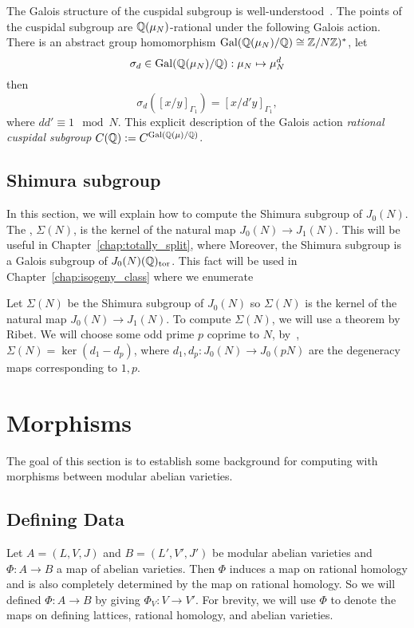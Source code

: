 The Galois structure of the cuspidal subgroup is well-understood~\cite[\S
1.3]{stevens:thesis}. The points of the cuspidal subgroup are
$\mathbb{Q}(\mu_N)$-rational under the following Galois action. There is an abstract
group homomorphism $\operatorname{Gal}(\mathbb{Q}(\mu_N)/\mathbb{Q})\cong \mathbb{Z}/N\mathbb{Z})^*$, let
\[
    \sigma_d\in \operatorname{Gal}(\mathbb{Q}(\mu_N)/\mathbb{Q}):\mu_N\mapsto \mu_N ^d
\]
then
\[
    \sigma_d([x/y]_{\Gamma_1})=[x/d'y]_{\Gamma_1},
\]
where $dd'\equiv 1 \mod{N}$. This explicit description of the Galois action
\emph{rational cuspidal subgroup} $C(\mathbb{Q}):=C^{\operatorname{Gal}(\mathbb{Q}(\mu)/\mathbb{Q})}$.

\subsection{Shimura subgroup}%
\label{sub:shimura}

In this section, we will explain how to compute the Shimura subgroup of
$J_0(N)$. The , $\Sigma(N)$, is the kernel of the
natural map $J_0(N)\to J_1(N)$. This will be useful in
Chapter~\ref{chap:totally_split}, where 
Moreover, the Shimura subgroup is a Galois subgroup of $J_0(N)(\mathbb{Q})_{\mathrm{tor}}$. This
fact will be used in Chapter~\ref{chap:isogeny_class} where we enumerate

Let $\Sigma(N)$ be the Shimura subgroup of $J_0(N)$ so $\Sigma(N)$ is the
kernel of the natural map $J_0(N)\to J_1(N)$. To compute $\Sigma(N)$, we will
use a theorem by Ribet. We will choose some odd prime $p$ coprime to $N$,
by~\cite[Prop. 1]{ribet:raising}, $\Sigma(N)=\ker(d_1-d_p)$, where
$d_1,d_p:J_0(N)\to J_0(pN)$ are the degeneracy maps corresponding to $1,p$.

\section{Morphisms}%
\label{sec:morphisms}

The goal of this section is to establish some background for computing with
morphisms between modular abelian varieties.

\subsection{Defining Data}%
\label{sub:defining_data}

Let $A=(L, V, J)$ and $B=(L', V', J')$ be modular abelian varieties and
$\Phi:A\to B$ a map of abelian varieties. Then $\Phi$ induces a map on rational
homology and is also completely determined by the map on rational homology. So
we will defined $\Phi:A\to B$ by giving $\Phi_V:V\to V'$. For brevity, we will
use $\Phi$ to denote the maps on defining lattices, rational homology, and
abelian varieties.


